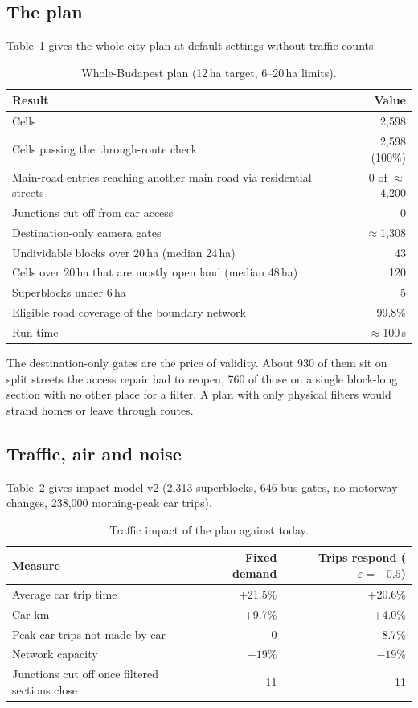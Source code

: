 \documentclass[11pt,a4paper]{article}
\begin{document}
\subsection{The plan}

Table~\ref{tab:plan} gives the whole-city plan at default settings without traffic counts.

\begin{table}[ht]
\centering\small
\caption{Whole-Budapest plan (12\,ha target, 6--20\,ha limits).}\label{tab:plan}
\begin{tabular}{@{}lr@{}}
\toprule
Result & Value \\
\midrule
Cells & 2,598 \\
Cells passing the through-route check & 2,598 (100\%) \\
Main-road entries reaching another main road via residential streets & 0 of $\approx$4,200 \\
Junctions cut off from car access & 0 \\
Destination-only camera gates & $\approx$1,308 \\
Undividable blocks over 20\,ha (median 24\,ha) & 43 \\
Cells over 20\,ha that are mostly open land (median 48\,ha) & 120 \\
Superblocks under 6\,ha & 5 \\
Eligible road coverage of the boundary network & 99.8\% \\
Run time & $\approx$100\,s \\
\bottomrule
\end{tabular}
\end{table}

The destination-only gates are the price of validity. About 930 of them sit on split streets the access repair had to reopen, 760 of those on a single block-long section with no other place for a filter. A plan with only physical filters would strand homes or leave through routes.

\subsection{Traffic, air and noise}

Table~\ref{tab:impact} gives impact model v2 (2,313 superblocks, 646 bus gates, no motorway changes, 238,000 morning-peak car trips).

\begin{table}[ht]
\centering\small
\caption{Traffic impact of the plan against today.}\label{tab:impact}
\begin{tabular}{@{}lrr@{}}
\toprule
Measure & Fixed demand & Trips respond ($\varepsilon=-0.5$) \\
\midrule
Average car trip time & +21.5\% & +20.6\% \\
Car-km & +9.7\% & +4.0\% \\
Peak car trips not made by car & 0 & 8.7\% \\
Network capacity & $-19$\% & $-19$\% \\
Junctions cut off once filtered sections close & 11 & 11 \\
\bottomrule
\end{tabular}
\end{table}
\end{document}
